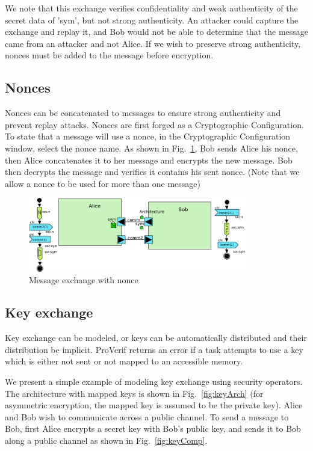 \documentclass{llncs}
\begin{document}
We note that this exchange verifies confidentiality and weak authenticity of the secret data of 'sym', but not strong
authenticity. An attacker could capture the exchange and replay it, and Bob would not be able to determine that the
message came from an attacker and not Alice. If we wish to preserve strong authenticity, nonces must be added to the
message before encryption.

\subsection{Nonces}

Nonces can be concatenated to messages to ensure strong authenticity and prevent replay attacks. Nonces are first forged
as a Cryptographic Configuration. To state that a message will use a nonce, in the Cryptographic Configuration window,
select the nonce name. As shown in Fig.~\ref{fig:nonce}, Bob sends Alice his
nonce, then Alice concatenates it to her message and encrypts the new message. Bob then decrypts the message and verifies it contains his sent nonce. (Note that
we allow a nonce to be used for more than one message)


\begin{figure}[htbp]
	\centering
 	\includegraphics[width=0.85\textwidth]{figures/securityStuff/nonceComp.pdf}
	\caption{Message exchange with nonce}
	\label{fig:nonce}
\end{figure}
\subsection{Key exchange}


Key exchange can be modeled, or keys can be automatically distributed and their distribution be implicit. ProVerif
returns an error if a task attempts to use a key which is either not sent or not mapped to an accessible memory. 

We present a simple example of modeling key exchange using security operators.
The architecture with mapped keys is shown in Fig.~\ref{fig:keyArch} (for
asymmetric encryption, the mapped key is assumed to be the private key). Alice
and Bob wish to communicate across a public channel. To send a message to Bob, first Alice encrypts a secret key with Bob's public key, and sends it to Bob along a public channel as shown in
Fig.~\ref{fig:keyComp}.
\end{document}
